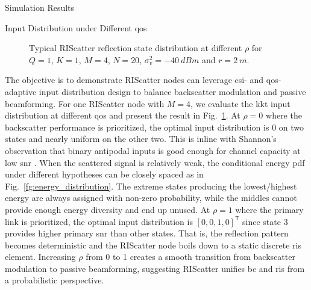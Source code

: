 \documentclass[journal]{IEEEtran}
\begin{document}
\begin{section}{Simulation Results}
	\begin{subsection}{Input Distribution under Different \gls{qos}}
		\begin{figure}[!t]
			\centering
			\resizebox{0.65\columnwidth}{!}{
				
			}
			\caption{Typical RIScatter reflection state distribution at different $\rho$ for $Q=1$, $K=1$, $M=4$, $N=20$, $\sigma_v^2=\qty{-40}{dBm}$ and $r=\qty{2}{m}$.}
			\label{fg:distribution_weights}
		\end{figure}
		The objective is to demonstrate RIScatter nodes can leverage \gls{csi}- and \gls{qos}-adaptive input distribution design to balance backscatter modulation and passive beamforming.
		For one RIScatter node with $M=4$, we evaluate the \gls{kkt} input distribution at different \gls{qos} and present the result in Fig.~\ref{fg:distribution_weights}.
		At $\rho=0$ where the backscatter performance is prioritized, the optimal input distribution is \num{0} on two states and nearly uniform on the other two.
		This is inline with Shannon's observation that binary antipodal inputs is good enough for channel capacity at low \gls{snr} \cite{Shannon1948}.
		When the scattered signal is relatively weak, the conditional energy \gls{pdf} under different hypotheses can be closely spaced as in Fig.~\ref{fg:energy_distribution}.
		The extreme states producing the lowest/highest energy are always assigned with non-zero probability, while the middles cannot provide enough energy diversity and end up unused.
		At $\rho=1$ where the primary link is prioritized, the optimal input distribution is $[0, 0, 1, 0]^\mathsf{T}$ since state 3 provides higher primary \gls{snr} than other states.
		That is, the reflection pattern becomes deterministic and the RIScatter node boils down to a static discrete \gls{ris} element.
		Increasing $\rho$ from \num{0} to \num{1} creates a smooth transition from backscatter modulation to passive beamforming, suggesting RIScatter unifies \gls{bc} and \gls{ris} from a probabilistic perspective.
	\end{subsection}


\end{section}
\end{document}
